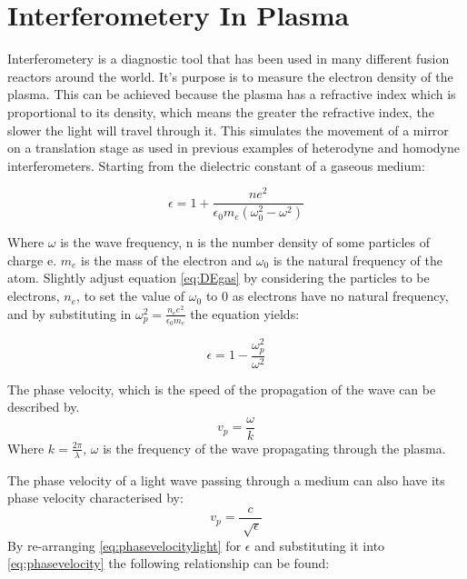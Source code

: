 \documentclass[12pt,a4paper,oneside]{report}
\begin{document}
    \section{Interferometery In Plasma}
Interferometery is a diagnostic tool that has been used in many different fusion reactors around the world. It's purpose is to measure the electron density of the plasma. This can be achieved because the plasma has a refractive index which is proportional to its density, which means the greater the refractive index, the slower the light will travel through it. This simulates the movement of a mirror on a translation stage as used in previous examples of heterodyne and homodyne interferometers. Starting from the dielectric constant of a gaseous medium:

\begin{equation}
\epsilon = 1 + \frac{ne^{2}}{\epsilon _{0} m_{e} (\omega _{0}^{2} - \omega ^{2})}
	\label{eq:DEgas}
\end{equation}

Where $\omega$ is the wave frequency, n is the number density of some particles of charge e. $m_{e}$ is the mass of the electron and $\omega _{0}$ is the natural frequency of the atom.
Slightly adjust equation \ref{eq:DEgas} by considering the particles to be electrons, $n_{e}$, to set the value of $\omega_{0}$ to 0 as electrons have no natural frequency, and by substituting in $\omega _{p}^{2} = \frac{n_{e}e^{2}}{\epsilon _{0} m_{e}}$ the equation yields:

\begin{equation}
\epsilon = 1 - \frac{\omega _{p}^{2}}{\omega ^{2}}
	\label{eq:DEgas}
\end{equation}

The phase velocity, which is the speed of the propagation of the wave can be described by.
\begin{equation}
v_{p} = \frac{\omega}{k}
	\label{eq:phasevelocity}
\end{equation}
Where $k = \frac{2\pi}{\lambda}$, $\omega$ is the frequency of the wave propagating through the plasma.

The phase velocity of a light wave passing through a medium can also have its phase velocity characterised by:
\begin{equation}
v_{p} = \frac{c}{\sqrt[]{\epsilon}}
	\label{eq:phasevelocitylight}
\end{equation}
By re-arranging \ref{eq:phasevelocitylight} for $\epsilon$ and substituting it into \ref{eq:phasevelocity} the following relationship can be found:
\end{document}
